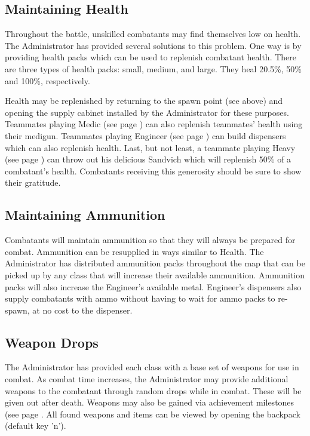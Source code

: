 \subsection{Maintaining Health}
\label{Maintaining_Health}
Throughout the battle, unskilled combatants may find themselves low on health.  The Administrator has provided several solutions to this problem.  One way is by providing health packs which can be used to replenish combatant health.  There are three types of health packs: small, medium, and large.  They heal 20.5\%, 50\% and 100\%, respectively.

Health may be replenished by returning to the spawn point (see above) and opening the supply cabinet installed by the Administrator for these purposes. Teammates playing Medic (see page \pageref{Medic}) can also replenish teammates' health using their medigun. Teammates playing Engineer (see page \pageref{Engineer}) can build dispensers which can also replenish health. Last, but not least, a teammate playing Heavy (see page \pageref{Heavy}) can throw out his delicious Sandvich which will replenish 50\% of a combatant's health.  Combatants receiving this generosity should be sure to show their gratitude.

\subsection{Maintaining Ammunition}
\label{Maintaining_Ammunition}
Combatants will maintain ammunition so that they will always be prepared for combat.  Ammunition can be resupplied in ways similar to Health.  The Administrator has distributed ammunition packs throughout the map that can be picked up by any class that will increase their available ammunition.  Ammunition packs will also increase the Engineer's available metal.  Engineer's dispensers also supply combatants with ammo without having to wait for ammo packs to re-spawn, at no cost to the dispenser.

\subsection{Weapon Drops}
The Administrator has provided each class with a base set of weapons for use in combat.  As combat time increases, the Administrator may provide additional weapons to the combatant through random drops while in combat. These will be given out after death.  Weapons may also be gained via achievement milestones (see page \pageref{Achievements}. All found weapons and items can be viewed by opening the backpack (default key 'n'). 

